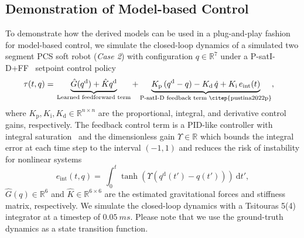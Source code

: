 \subsection{Demonstration of Model-based Control}\label{sub:pcsregression:validation:model_based_control}
To demonstrate how the derived models can be used in a plug-and-play fashion for model-based control, we simulate the closed-loop dynamics of a simulated two segment \gls{PCS} soft robot (\emph{Case 2}) with configuration $q \in \mathbb{R}^7$ under a P-satI-D+FF~\citep{della2023model, stolzle2024experimental, stolzle2024input} setpoint control policy
\begin{equation}
\begin{split}
    \tau(t, q) =& \: \underbrace{\hat{G}(q^\mathrm{d})+\hat{K}q^\mathrm{d}}_{\text{Learned feedforward term}} + \underbrace{K_\mathrm{p} \, (q^\mathrm{d} - q) - K_\mathrm{d} \, \dot{q} + K_\mathrm{i} \, e_\mathrm{int}(t) }_{\text{P-satI-D feedback term~\citep{pustina2022p}}},
\end{split}
\end{equation}
where $K_\mathrm{p}, K_\mathrm{i}, K_\mathrm{d} \in \mathbb{R}^{n \times n}$ are the proportional, integral, and derivative control gains, respectively.
The feedback control term is a PID-like controller with integral saturation~\citep{pustina2022p} and the dimensionless gain $\Upsilon \in \mathbb{R}$ which bounds the integral error at each time step to the interval $(-1, 1)$ and reduces the risk of instability for nonlinear systems
\begin{equation}
    e_\mathrm{int}(t, q) = \:  \int_0^t \tanh(\Upsilon (q^\mathrm{d}(t') - q(t'))) \: \mathrm{d}t',
\end{equation}
$\hat{G}(q) \in \mathbb{R}^{6}$ and $\hat{K} \in \mathbb{R}^{6 \times 6}$ are the estimated gravitational forces and stiffness matrix, respectively.
We simulate the closed-loop dynamics with a Tsitouras 5(4) integrator at a timestep of $\SI{0.05}{ms}$.
Please note that we use the ground-truth dynamics as a state transition function.

